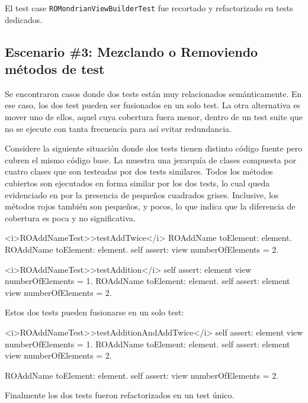 \par El test case {\tt ROMondrianViewBuilderTest} fue recortado y refactorizado en tests dedicados.

\newpage
\subsection{Escenario \#3: Mezclando o Removiendo métodos de test}

\par Se encontraron casos donde dos tests están muy relacionados semánticamente. En ese caso, los dos test pueden ser fusionados en un solo test. La otra alternativa es mover uno de ellos, aquel cuya cobertura fuera menor, dentro de un test suite que no se ejecute con tanta frecuencia para así evitar redundancia.


\par Considere la siguiente situación donde dos tests tienen distinto código fuente pero cubren el mismo código base. La  muestra una jerarquía de clases compuesta por cuatro clases que son testeadas por dos tests similares. Todos los métodos cubiertos son ejecutados en forma similar por los dos tests, lo cual queda evidenciado en por la presencia de pequeños cuadrados grises. Inclusive, los métodos rojos también son pequeños, y pocos, lo que indica que la diferencia de cobertura es poca y no significativa.%


\begin{codeWithLineNumbers}
<i>ROAddNameTest>>testAddTwice</i>
	ROAddName toElement: element.
	ROAddName toElement: element.
	self assert: view numberOfElements = 2.
		
<i>ROAddNameTest>>testAddition</i>
	self assert: element view numberOfElements = 1.
	ROAddName toElement: element.
	self assert: element view numberOfElements = 2.	 
\end{codeWithLineNumbers}

\par Estos dos tests pueden fusionarse en un solo test: 

\begin{codeWithLineNumbers}
<i>ROAddNameTest>>testAdditionAndAddTwice</i>
	self assert: element view numberOfElements = 1.
	ROAddName toElement: element.
	self assert: element view numberOfElements = 2.

	ROAddName toElement: element.	
	self assert: view numberOfElements = 2.

\end{codeWithLineNumbers}

\par Finalmente los dos tests fueron refactorizados en un test único.

